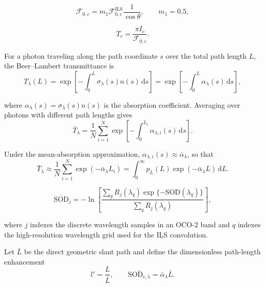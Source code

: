 \begin{equation}
\mathcal{F}_{0,c}
=
m_1
\mathcal{F}_{0,c}^{\mathrm{ILS}}
\frac{1}{\cos\theta},
\qquad
m_1 = 0.5,
\label{eq:effective_solar_normalization}
\end{equation}


\begin{equation}
T_c
=
\frac{\pi I_c}{\mathcal{F}_{0,c}}.
\label{eq:code_transmittance}
\end{equation}






For a photon traveling along the path coordinate $s$ over the total path length $L$, the Beer--Lambert transmittance is
\begin{equation}
T_{\lambda}(L)
=
\exp\left[
-
\int_0^L
\sigma_{\lambda}(s)n(s)
\,\mathrm{d}s
\right]
=
\exp\left[
-
\int_0^L
\alpha_{\lambda}(s)
\,\mathrm{d}s
\right],
\label{eq:beer_lambert_path}
\end{equation}



where $\alpha_{\lambda}(s)=\sigma_{\lambda}(s)n(s)$ is the absorption
coefficient. Averaging over photons with different path lengths gives
\begin{equation}
\bar{T}_{\lambda}
=
\frac{1}{N}
\sum_{i=1}^{N}
\exp\left[
-
\int_0^{L_i}
\alpha_{\lambda,i}(s)
\,\mathrm{d}s
\right].
\label{eq:ensemble_transmittance}
\end{equation}


Under the mean-absorption approximation,
$\alpha_{\lambda,i}(s)\approx\bar{\alpha}_{\lambda}$, so that
\begin{equation}
\bar{T}_{\lambda}
\approx
\frac{1}{N}
\sum_{i=1}^{N}
\exp(-\bar{\alpha}_{\lambda}L_i)
=
\int_0^\infty
p_L(L)
\exp(-\bar{\alpha}_{\lambda}L)
\,\mathrm{d}L .
\label{eq:path_length_laplace_dimensional}
\end{equation}

\begin{equation}
\overline{\mathrm{SOD}}_j
=
-\ln
\left[
\frac{
\sum_q R_j(\lambda_q)
\exp\{-\mathrm{SOD}(\lambda_q)\}
}{
\sum_q R_j(\lambda_q)
}
\right],
\end{equation}

where $j$ indexes the discrete wavelength samples in an OCO-2 band and
$q$ indexes the high-resolution wavelength grid used for the ILS convolution.


Let $\bar{L}$ be the direct geometric slant path and define the dimensionless
path-length enhancement
\begin{equation}
l' = \frac{L}{\bar{L}},
\qquad
\overline{\mathrm{SOD_{c, \lambda}}}
=
\bar{\alpha}_{\lambda}\bar{L}.
\label{eq:path_enhancement_tau}
\end{equation}



